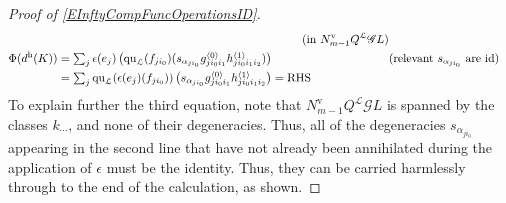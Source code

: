 \documentclass[11pt]{amsart} \renewcommand{\baselinestretch}{1.2}
\theoremstyle{plain}
\theoremstyle{definition}
\newcommand{\scrG}{\mathscr{G}}
\newcommand{\call}{\mathcal{L}}
\newcommand{\BSW}{{\scrG}}
\newcommand{\quadratic}{\mathrm{qu}}
\newcommand{\Id}{\mathrm{id}}
\newcommand{\uver}{^\mathrm{v}}
\newcommand{\uhor}{^\mathrm{h}}
\begin{document}
\begin{Operations in composite functor spectral sequences}
\begin{proof}[Proof of \ref{EInftyCompFuncOperationsID}]
\begin{alignat*}{2}
&\qquad&\text{(in $N\uver_{m-1}Q^{\call}\BSW L)$}\\
\Phi(d\uhor(K))&=
\textstyle\sum_j \epsilon (e_j)\left( {\quadratic_\call}(f_{ji_0})(s_{\alpha_{ji_0}}g^{\smash{\langle} 0\smash{\rangle}}_{ji_0i_1}h^{\smash{\langle} 1\smash{\rangle}}_{ji_0i_1i_2})\right)%
&\qquad&\text{(relevant $s_{\alpha_{ji_0}}$ are $\Id$)}\\
&=
\textstyle\sum_j {\quadratic_\call}(\epsilon (e_j)(f_{ji_0}))\left(s_{\alpha_{ji_0}} {g^{\smash{\langle} 0\smash{\rangle}}_{ji_0i_1}h^{\smash{\langle} 1\smash{\rangle}}_{ji_0i_1i_2}}\right) ={}\makebox[0cm][l]{\textup{RHS}}.
\end{alignat*}
To explain further the third equation, note that $N\uver_{m-1}Q^{\call}\BSW L$ is spanned by the classes $k_{\cdots }$, and none of  their degeneracies. Thus, all of the degeneracies $s_{\alpha_{ji_0}}$ appearing in the second line that have not already been annihilated during the application of $\epsilon$ must be the identity. Thus, they can be carried harmlessly through to the end of the calculation, as shown.
\end{proof}













\end{Operations in composite functor spectral sequences}
\end{document}
